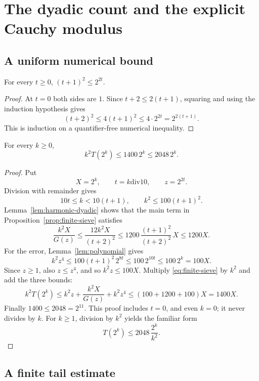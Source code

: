 \section{The dyadic count and the explicit Cauchy modulus}
\label{sec:convergence}

\subsection{A uniform numerical bound}

\begin{lemma}
\label{lem:polynomial}
For every \(t\ge0\), \((t+1)^2\le2^{2t}\).
\end{lemma}

\begin{proof}
At \(t=0\) both sides are \(1\).
Since \(t+2\le2(t+1)\), squaring and using the induction hypothesis gives
\[
 (t+2)^2\le4(t+1)^2\le4\cdot2^{2t}=2^{2(t+1)}.
\]
This is induction on a quantifier-free numerical inequality.
\end{proof}

\begin{proposition}
\label{prop:dyadic-count}
For every \(k\ge0\),
\[
 k^2T(2^k)\le1400\,2^k\le2048\,2^k.
\]
\end{proposition}

\begin{proof}
Put
\[
 X=2^k,\qquad t=k\mathbin{\mathrm{div}}10,\qquad z=2^{2t}.
\]
Division with remainder gives
\[
 10t\le k<10(t+1),\qquad
 k^2\le100(t+1)^2.
\]
Lemma~\ref{lem:harmonic-dyadic} shows that the main term in
Proposition~\ref{prop:finite-sieve} satisfies
\[
 \frac{k^2X}{G(z)}
 \le\frac{12k^2X}{(t+2)^2}
 \le1200\,\frac{(t+1)^2}{(t+2)^2}\,X
 \le1200X.
\]
For the error, Lemma~\ref{lem:polynomial} gives
\[
 k^2z^4\le100(t+1)^2\,2^{8t}
          \le100\,2^{10t}
          \le100\,2^k=100X.
\]
Since \(z\ge1\), also \(z\le z^4\), and so \(k^2z\le100X\).
Multiply \eqref{eq:finite-sieve} by \(k^2\) and add the three bounds:
\[
 k^2T(2^k)
 \le k^2z+\frac{k^2X}{G(z)}+k^2z^4
 \le(100+1200+100)X=1400X.
\]
Finally \(1400\le2048=2^{11}\).
This proof includes \(t=0\), and even \(k=0\); it never divides by \(k\).
For \(k\ge1\), division by \(k^2\) yields the familiar form
\[
 T(2^k)\le2048\,\frac{2^k}{k^2}.
\]
\end{proof}

\subsection{A finite tail estimate}

